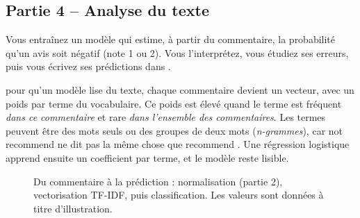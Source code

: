 \subsection*{Partie 4 -- Analyse du texte \hfill {}}

Vous entraînez un modèle qui estime, à partir du commentaire, la probabilité qu'un avis soit
négatif (note 1 ou 2). Vous l'interprétez, vous étudiez ses erreurs, puis vous écrivez ses
prédictions dans .

\begin{notion}[TF-IDF]
pour qu'un modèle lise du texte, chaque commentaire devient un vecteur, avec un poids
par terme du vocabulaire. Ce poids est élevé quand le terme est fréquent \emph{dans ce commentaire}
et rare \emph{dans l'ensemble des commentaires}. Les termes peuvent être des mots seuls ou des groupes
de deux mots (\emph{n-grammes}), car \og not recommend \fg{} ne dit pas la même chose que
\og recommend \fg{}. Une régression logistique apprend ensuite un coefficient par terme, et le modèle
reste lisible.
\end{notion}

\begin{figure}[H]
\centering
{}
\caption{Du commentaire à la prédiction : normalisation (partie 2), vectorisation TF-IDF, puis
classification. Les valeurs sont données à titre d'illustration.}
\label{c4:fig:tfidf}
\end{figure}

